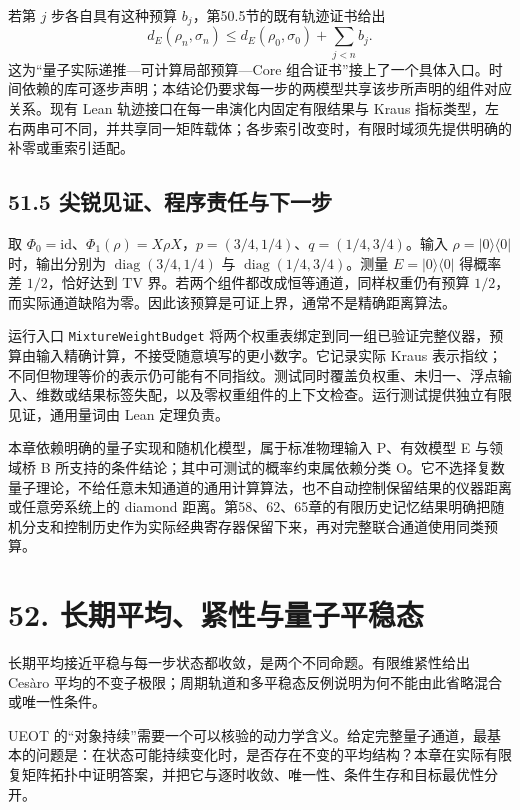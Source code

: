 \documentclass[
  11pt,
  oneside]{book}
\begin{document}
若第 \(j\) 步各自具有这种预算 \(b_j\)，第50.5节的既有轨迹证书给出 \[
d_E(\rho_n,\sigma_n)\le d_E(\rho_0,\sigma_0)+\sum_{j<n}b_j.
\] 这为``量子实际递推---可计算局部预算---Core
组合证书''接上了一个具体入口。时间依赖的库可逐步声明；本结论仍要求每一步的两模型共享该步所声明的组件对应关系。现有
Lean 轨迹接口在每一串演化内固定有限结果与 Kraus
指标类型，左右两串可不同，并共享同一矩阵载体；各步索引改变时，有限时域须先提供明确的补零或重索引适配。

\section{51.5 尖锐见证、程序责任与下一步}

取
\(\Phi_0=\mathrm{id}\)、\(\Phi_1(\rho)=X\rho X\)，\(p=(3/4,1/4)\)、\(q=(1/4,3/4)\)。输入
\(\rho=|0\rangle\langle0|\) 时，输出分别为
\(\operatorname{diag}(3/4,1/4)\) 与
\(\operatorname{diag}(1/4,3/4)\)。测量 \(E=|0\rangle\langle0|\) 得概率差
\(1/2\)，恰好达到 TV 界。若两个组件都改成恒等通道，同样权重仍有预算
\(1/2\)，而实际通道缺陷为零。因此该预算是可证上界，通常不是精确距离算法。

运行入口 \texttt{Mixture\allowbreak Weight\allowbreak Budget}
将两个权重表绑定到同一组已验证完整仪器，预算由输入精确计算，不接受随意填写的更小数字。它记录实际
Kraus
表示指纹；不同但物理等价的表示仍可能有不同指纹。测试同时覆盖负权重、未归一、浮点输入、维数或结果标签失配，以及零权重组件的上下文检查。运行测试提供独立有限见证，通用量词由
Lean 定理负责。

本章依赖明确的量子实现和随机化模型，属于标准物理输入 P、有效模型 E
与领域桥 B 所支持的条件结论；其中可测试的概率约束属依赖分类
O。它不选择复数量子理论，不给任意未知通道的通用计算算法，也不自动控制保留结果的仪器距离或任意旁系统上的
diamond
距离。第58、62、65章的有限历史记忆结果明确把随机分支和控制历史作为实际经典寄存器保留下来，再对完整联合通道使用同类预算。

\chapter{52. 长期平均、紧性与量子平稳态}\label{ch-52}\hypertarget{ch-52}{}

长期平均接近平稳与每一步状态都收敛，是两个不同命题。有限维紧性给出
Cesàro
平均的不变子极限；周期轨道和多平稳态反例说明为何不能由此省略混合或唯一性条件。

UEOT
的``对象持续''需要一个可以核验的动力学含义。给定完整量子通道，最基本的问题是：在状态可能持续变化时，是否存在不变的平均结构？本章在实际有限复矩阵拓扑中证明答案，并把它与逐时收敛、唯一性、条件生存和目标最优性分开。
\end{document}
